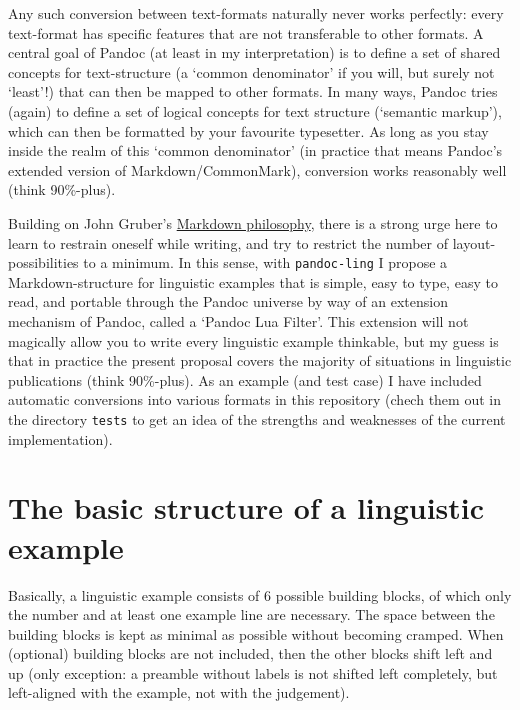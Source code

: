 \documentclass[
]{article}
\begin{document}
Any such conversion between text-formats naturally never works
perfectly: every text-format has specific features that are not
transferable to other formats. A central goal of Pandoc (at least in my
interpretation) is to define a set of shared concepts for text-structure
(a `common denominator' if you will, but surely not `least'!) that can
then be mapped to other formats. In many ways, Pandoc tries (again) to
define a set of logical concepts for text structure (`semantic markup'),
which can then be formatted by your favourite typesetter. As long as you
stay inside the realm of this `common denominator' (in practice that
means Pandoc's extended version of Markdown/CommonMark), conversion
works reasonably well (think 90\%-plus).

Building on John Gruber's
\href{https://daringfireball.net/projects/markdown/syntax}{Markdown
philosophy}, there is a strong urge here to learn to restrain oneself
while writing, and try to restrict the number of layout-possibilities to
a minimum. In this sense, with \texttt{pandoc-ling} I propose a
Markdown-structure for linguistic examples that is simple, easy to type,
easy to read, and portable through the Pandoc universe by way of an
extension mechanism of Pandoc, called a `Pandoc Lua Filter'. This
extension will not magically allow you to write every linguistic example
thinkable, but my guess is that in practice the present proposal covers
the majority of situations in linguistic publications (think 90\%-plus).
As an example (and test case) I have included automatic conversions into
various formats in this repository (chech them out in the directory
\texttt{tests} to get an idea of the strengths and weaknesses of the
current implementation).

\hypertarget{the-basic-structure-of-a-linguistic-example}{%
\section{The basic structure of a linguistic
example}\label{the-basic-structure-of-a-linguistic-example}}

Basically, a linguistic example consists of 6 possible building blocks,
of which only the number and at least one example line are necessary.
The space between the building blocks is kept as minimal as possible
without becoming cramped. When (optional) building blocks are not
included, then the other blocks shift left and up (only exception: a
preamble without labels is not shifted left completely, but left-aligned
with the example, not with the judgement).
\end{document}
